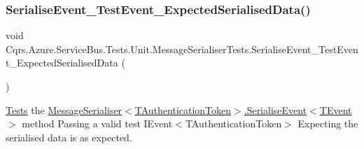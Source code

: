 \subsubsection{\texorpdfstring{Serialise\+Event\+\_\+\+Test\+Event\+\_\+\+Expected\+Serialised\+Data()}{SerialiseEvent\_TestEvent\_ExpectedSerialisedData()}}
{\footnotesize\ttfamily void Cqrs.\+Azure.\+Service\+Bus.\+Tests.\+Unit.\+Message\+Serialiser\+Tests.\+Serialise\+Event\+\_\+\+Test\+Event\+\_\+\+Expected\+Serialised\+Data (\begin{DoxyParamCaption}{ }\end{DoxyParamCaption})}



\hyperlink{namespaceCqrs_1_1Azure_1_1ServiceBus_1_1Tests}{Tests} the \hyperlink{classCqrs_1_1Azure_1_1ServiceBus_1_1MessageSerialiser_a596224ec927c673958e72a2153931c09_a596224ec927c673958e72a2153931c09}{Message\+Serialiser$<$\+T\+Authentication\+Token$>$.\+Serialise\+Event$<$\+T\+Event$>$} method Passing a valid test I\+Event$<$\+T\+Authentication\+Token$>$ Expecting the serialised data is as expected. 

